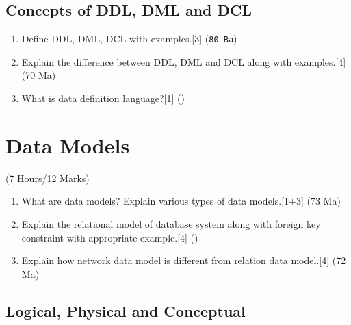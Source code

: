 \documentclass[12pt]{article}
\begin{document}
    \subsection{Concepts of DDL, DML and DCL}
    \begin{enumerate}
    \item Define DDL, DML, DCL with examples.\hfill[3] (\texttt{80 Ba})
    \item Explain the difference between DDL, DML and DCL along with examples.\hfill[4] (70 Ma)
    \item What is data definition language?\hfill[1] ()
    \end{enumerate}

    \pagebreak
\section{Data Models}
    \begin{center}(7 Hours/12 Marks)\end{center}
    \begin{enumerate}
    \item What are data models? Explain various types of data models.\hfill[1+3] (73 Ma)

    \item Explain the relational model of database system along with foreign key constraint with appropriate example.\hfill[4] ()

    \item Explain how network data model is different from relation data model.\hfill[4] (72 Ma)
    \end{enumerate}
    \subsection{Logical, Physical and Conceptual}
\end{document}
